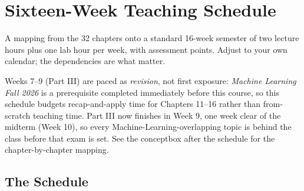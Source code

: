 \chapter{Sixteen-Week Teaching Schedule}\label{app:schedule}
\normalfigures

A mapping from the 32 chapters onto a standard 16-week semester of two lecture
hours plus one lab hour per week, with assessment points. Adjust to your own
calendar; the dependencies are what matter.

Weeks 7--9 (Part III) are paced as \emph{revision}, not first exposure:
\emph{Machine Learning Fall 2026} is a prerequisite completed immediately before
this course, so this schedule budgets recap-and-apply time for Chapters 11--16
rather than from-scratch teaching time. Part III now finishes in Week 9, one
week clear of the midterm (Week 10), so every Machine-Learning-overlapping
topic is behind the class before that exam is set. See the conceptbox after
the schedule for the chapter-by-chapter mapping.

\section{The Schedule}

